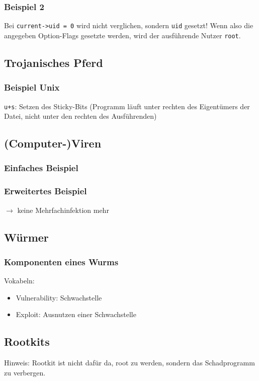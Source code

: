 \subsubsection*{Beispiel 2}
Bei \lstinline`current->uid = 0` wird nicht verglichen, sondern \lstinline`uid` gesetzt! Wenn also die angegeben Option-Flags gesetzte werden, wird der ausführende Nutzer \lstinline`root`.

\subsection{Trojanisches Pferd}
\subsubsection*{Beispiel Unix}
\lstinline`u+s`: Setzen des Sticky-Bits (Programm läuft unter rechten des Eigentümers der Datei, nicht unter den rechten des Ausführenden)

\subsection{(Computer-)Viren}
\subsubsection*{Einfaches Beispiel}
\subsubsection*{Erweitertes Beispiel}
$\to$ keine Mehrfachinfektion mehr

\subsection{Würmer}
\subsubsection*{Komponenten eines Wurms}
Vokabeln:
\begin{itemize}
\item Vulnerability: Schwachstelle
\item Exploit: Ausnutzen einer Schwachstelle
\end{itemize}

\subsection{Rootkits}
Hinweis: Rootkit ist nicht dafür da, root zu werden, sondern das Schadprogramm zu verbergen.
